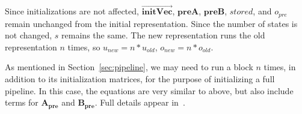 Since initializations are not affected,
$\overrightarrow{\mathbf{initVec}}$, $\mathbf{preA}$, $\mathbf{preB}$,
$stored$, and $o_{pre}$ remain unchanged from the initial
representation. Since the number of states is not changed, $s$ remains
the same. The new representation runs the old representation $n$
times, so $u_{new} = n * u_{old}$, $o_{new} = n * o_{old}$.

As mentioned in Section~\ref{sec:pipeline}, we may need to run a block
$n$ times, in addition to its initialization matrices, for the purpose
of initializing a full pipeline.  In this case, the equations are very
similar to above, but also include terms for $\mathbf{A_{pre}}$ and
$\mathbf{B_{pre}}$.  Full details appear in~\cite{Agrawal04}.


